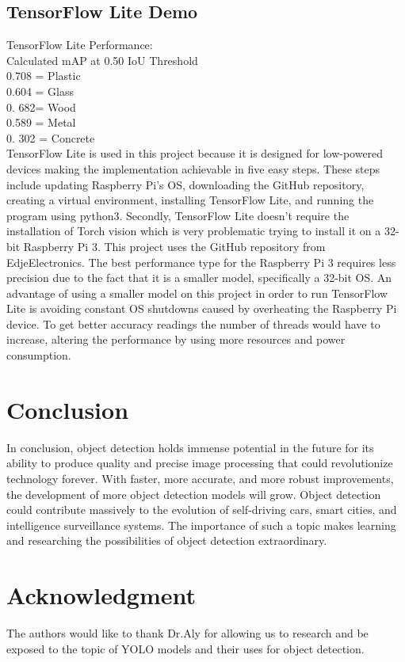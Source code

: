 \documentclass[conference]{IEEEtran}
\begin{document}
\subsection{TensorFlow Lite Demo}

TensorFlow Lite Performance:\\
Calculated mAP at 0.50 IoU Threshold\\
0.708 = Plastic\\
0.604 = Glass\\
0. 682= Wood\\
0.589 = Metal\\ 
0. 302 = Concrete\\

TensorFlow Lite is used in this project because it is designed for low-powered devices making the implementation achievable in five easy steps. These steps include updating Raspberry Pi's OS, downloading the GitHub repository, creating a virtual environment, installing TensorFlow Lite, and running the program using python3. Secondly, TensorFlow Lite doesn't require the installation of Torch vision which is very problematic trying to install it on a 32-bit Raspberry Pi 3. This project uses the GitHub repository from EdjeElectronics. The best performance type for the Raspberry Pi 3 requires less precision due to the fact that it is a smaller model, specifically a 32-bit OS. An advantage of using a smaller model on this project in order to run TensorFlow Lite is avoiding constant OS shutdowns caused by overheating the Raspberry Pi device. To get better accuracy readings the number of threads would have to increase, altering the performance by using more resources and power consumption.

\section{Conclusion}
In conclusion, object detection holds immense potential in the future for its ability to produce quality and precise image processing that could revolutionize technology forever. With faster, more accurate, and more robust improvements, the development of more object detection models will grow. Object detection could contribute massively to the evolution of self-driving cars, smart cities, and intelligence surveillance systems.\cite{Kanjee_2023} The importance of such a topic makes learning and researching the possibilities of object detection extraordinary.    
 
\section*{Acknowledgment}

The authors would like to thank Dr.Aly for allowing us to research and be exposed to the topic of YOLO models and their uses for object detection. 

\cite{Jocher_2023}
\cite{Arie_2022}
\cite{Lee_2021}


\end{document}
